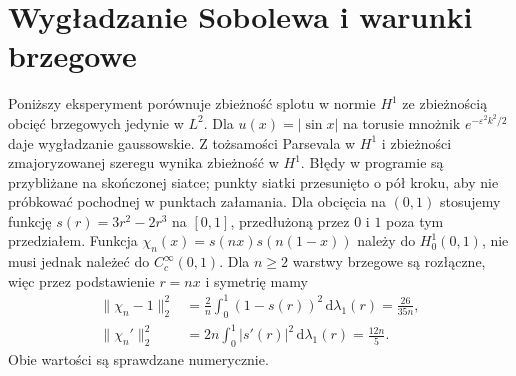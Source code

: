 \section{Wygładzanie Sobolewa i warunki brzegowe}
Poniższy eksperyment porównuje zbieżność splotu w normie $H^1$
ze zbieżnością obcięć brzegowych jedynie w $L^2$.
Dla $u(x)=|\sin x|$ na torusie mnożnik
$e^{-\varepsilon^2 k^2/2}$ daje wygładzanie gaussowskie.
Z tożsamości Parsevala w $H^1$ i zbieżności
zmajoryzowanej szeregu wynika zbieżność w $H^1$.
Błędy w programie są przybliżane na skończonej
siatce; punkty siatki przesunięto o pół kroku,
aby nie próbkować pochodnej w punktach załamania.
Dla obcięcia na $(0,1)$ stosujemy funkcję
$s(r)=3r^2-2r^3$ na $[0,1]$, przedłużoną przez
$0$ i $1$ poza tym przedziałem.
Funkcja $\chi_n(x)=s(nx)s(n(1-x))$ należy do
$H_0^1(0,1)$, nie musi jednak należeć do
$C_c^\infty(0,1)$.
Dla $n\ge2$ warstwy brzegowe są rozłączne,
więc przez podstawienie $r=nx$ i symetrię mamy
\[
 \begin{aligned}
 \|\chi_n-1\|_2^2
 &=\frac2n\int_0^1(1-s(r))^2\,\mathrm d\lambda_1(r)
 =\frac{26}{35n},\\
 \|\chi_n'\|_2^2
 &=2n\int_0^1|s'(r)|^2\,\mathrm d\lambda_1(r)
 =\frac{12n}{5}.
 \end{aligned}
\]
Obie wartości są sprawdzane numerycznie.
